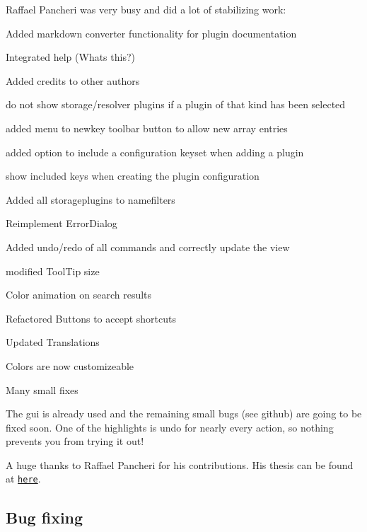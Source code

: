 Raffael Pancheri was very busy and did a lot of stabilizing work\+:


\begin{DoxyItemize}
\item Added markdown converter functionality for plugin documentation
\item Integrated help (Whats this?)
\item Added credits to other authors
\item do not show storage/resolver plugins if a plugin of that kind has been selected
\item added menu to newkey toolbar button to allow new array entries
\item added option to include a configuration keyset when adding a plugin
\item show included keys when creating the plugin configuration
\item Added all storageplugins to namefilters
\item Reimplement Error\+Dialog
\item Added undo/redo of all commands and correctly update the view
\item modified Tool\+Tip size
\item Color animation on search results
\item Refactored Buttons to accept shortcuts
\item Updated Translations
\item Colors are now customizeable
\item Many small fixes
\end{DoxyItemize}

The gui is already used and the remaining small bugs (see github) are going to be fixed soon. One of the highlights is undo for nearly every action, so nothing prevents you from trying it out!

A huge thanks to Raffael Pancheri for his contributions. His thesis can be found at \href{https://www.libelektra.org/ftp/elektra/pancheri2015gui.pdf}{\tt here}.

\subsection*{Bug fixing}


